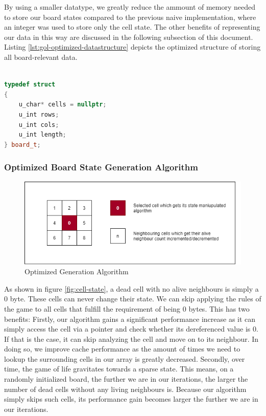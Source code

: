 \documentclass[a4paper,english,12pt,twoside=false]{scrartcl} %
\begin{document}
By using a smaller datatype, we greatly reduce the ammount of memory needed to store our board states compared to the previous naive implementation, where an integer was used to store only the cell state. The other benefits of representing our data in this way are discussed in the following subsection of this document. Listing \ref{lst:gol-optimized-datastructure} depicts the optimized structure of storing all board-relevant data.

\begin{lstlisting}[caption={Parallel Naive State Generation Algorithm},label={lst:gol-optimized-datastructure},language=C++]

typedef struct
{
    u_char* cells = nullptr;
    u_int rows;
    u_int cols;
    u_int length;
} board_t;

\end{lstlisting}

\subsubsection{Optimized Board State Generation Algorithm}

\begin{figure}[tbh!]
	\centering
	\includegraphics[width=16cm]{imgs/cell-algo.png}
	\caption{Optimized Generation Algorithm}
	\label{fig:cell-algo}
\end{figure}

As shown in figure \ref{fig:cell-state}, a dead cell with no alive neighbours is simply a 0 byte. These cells can never change their state. We can skip applying the rules of the game to all cells that fulfill the requirement of being 0 bytes. This has two benefits: Firstly, our algorithm gains a significant performance increase as it can simply access the cell via a pointer and check whether its dereferenced value is 0. If that is the case, it can skip analyzing the cell and move on to its neighbour. In doing so, we improve cache performance as the amount of times we need to lookup the surrounding cells in our array is greatly decreased. Secondly, over time, the game of life gravitates towards a sparse state. This means, on a randomly initialized board, the further we are in our iterations, the larger the number of dead cells without any living neighbours is. Because our algorithm simply skips such cells, its performance gain becomes larger the further we are in our iterations.
\end{document}
